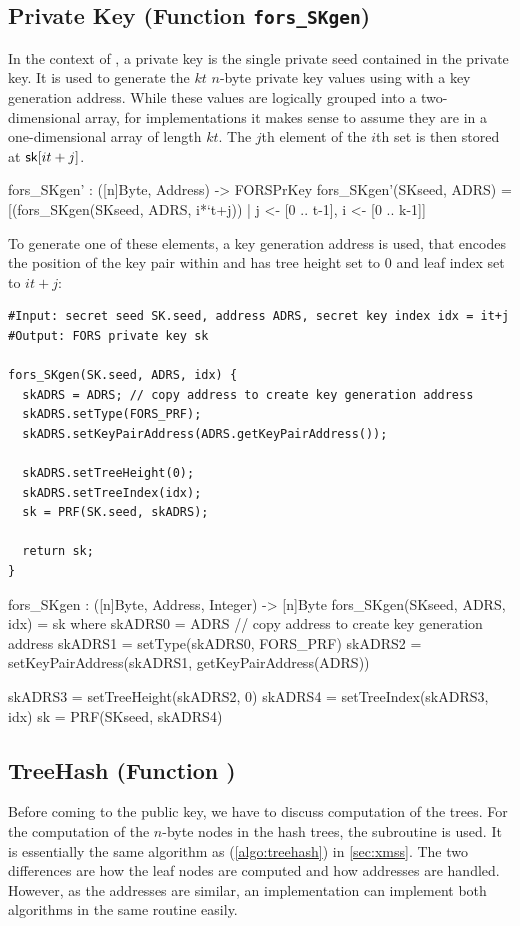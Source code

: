 \subsection{\fors Private Key (Function \texttt{fors\_SKgen})} 
In the context of \spx, a \fors private key is the single private seed \sseed
contained in the \spx private key. It is used to generate the $kt$ $n$-byte 
private key values using \sphincsPRF with a \fors key generation address. While these values are 
logically grouped into a two-dimensional array, for implementations it makes sense to assume they 
are in a one-dimensional array of length $kt$. 
The $j$th element of the $i$th set is then stored at $\mathsf{sk}[it + j]$. 
\begin{code}
  fors_SKgen' : ([n]Byte, Address) -> FORSPrKey
  fors_SKgen'(SKseed, ADRS) =
    [(fors_SKgen(SKseed, ADRS, i*`t+j)) | j <- [0 .. t-1], i <- [0 .. k-1]]
\end{code}
To generate one of these elements, a \fors key generation address \skadrs is used, that encodes the 
position of the \fors key pair within \spx and has 
tree height set to $0$ and leaf index set to $it+j$: 

\begin{lstlisting}[label=alg:fors_skgen, language=pseudoc,
                   caption=\texttt{fors\_SKgen} -- Computing a \fors private key value.]
#Input: secret seed SK.seed, address ADRS, secret key index idx = it+j
#Output: FORS private key sk

fors_SKgen(SK.seed, ADRS, idx) {
  skADRS = ADRS; // copy address to create key generation address
  skADRS.setType(FORS_PRF);
  skADRS.setKeyPairAddress(ADRS.getKeyPairAddress());
  
  skADRS.setTreeHeight(0);
  skADRS.setTreeIndex(idx);
  sk = PRF(SK.seed, skADRS);

  return sk;
}
\end{lstlisting}

\begin{code}
  fors_SKgen : ([n]Byte, Address, Integer) -> [n]Byte
  fors_SKgen(SKseed, ADRS, idx) = sk where
    skADRS0 = ADRS // copy address to create key generation address
    skADRS1 = setType(skADRS0, FORS_PRF)
    skADRS2 = setKeyPairAddress(skADRS1, getKeyPairAddress(ADRS))

    skADRS3 = setTreeHeight(skADRS2, 0)
    skADRS4 = setTreeIndex(skADRS3, idx)
    sk = PRF(SKseed, skADRS4)
\end{code}

\subsection{\fors TreeHash (Function \forstreehash)}
   Before coming to the \fors public key, we have to discuss computation of the 
   trees.
   For the computation of the $n$-byte nodes in the \fors hash trees,
   the subroutine \forstreehash is used. It is essentially the same algorithm
   as \treehash (\autoref{algo:treehash}) in \autoref{sec:xmss}. The two 
   differences are how the leaf nodes are computed and how addresses are handled.
   However, as the addresses are similar, an implementation can implement both
   algorithms in the same routine easily.
   
